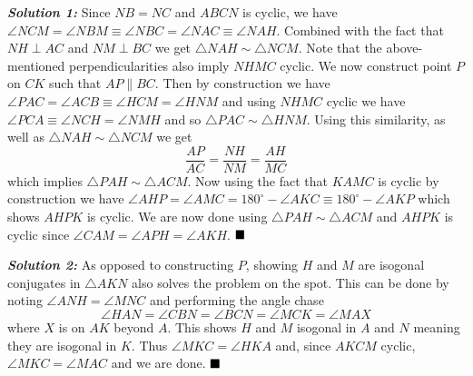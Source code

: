 \documentclass[11pt]{article}
\newcommand{\solnum}[1]{\textbf{\textit{Solution #1: }}}
\begin{document}
\begin{enumerate}
\begin{center}
\end{center}

\solnum{1} Since $NB=NC$ and $ABCN$ is cyclic, we have $\angle NCM=\angle NBM\equiv\angle NBC=\angle NAC\equiv\angle NAH$. Combined with the fact that $NH\perp AC$ and $NM\perp BC$ we get $\triangle NAH\sim\triangle NCM$. Note that the above-mentioned perpendicularities also imply $NHMC$ cyclic. We now construct point $P$ on $CK$ such that $AP\parallel BC$. Then by construction we have $\angle PAC =\angle ACB\equiv\angle HCM = \angle HNM$ and using $NHMC$ cyclic we have $\angle PCA\equiv\angle NCH = \angle NMH$ and so $\triangle PAC\sim\triangle HNM$. Using this similarity, as well as $\triangle NAH\sim\triangle NCM$ we get \[ \frac{AP}{AC}=\frac{NH}{NM}=\frac{AH}{MC} \] which implies $\triangle PAH\sim\triangle ACM$. Now using the fact that $KAMC$ is cyclic by construction we have $\angle AHP = \angle AMC = 180^{\circ}-\angle AKC\equiv 180^{\circ}-\angle AKP$ which shows $AHPK$ is cyclic. We are now done using $\triangle PAH\sim\triangle ACM$ and $AHPK$ is cyclic since \(\angle CAM = \angle APH = \angle AKH\). $\hfill\blacksquare$

\solnum{2} As opposed to constructing $P$, showing $H$ and $M$ are isogonal conjugates in $\triangle AKN$ also solves the problem on the spot. This can be done by noting $\angle ANH=\angle MNC$ and performing the angle chase \[\angle HAN = \angle CBN = \angle BCN = \angle MCK = \angle MAX\]where $X$ is on $AK$ beyond $A$. This shows $H$ and $M$ isogonal in $A$ and $N$ meaning they are isogonal in $K$. Thus $\angle MKC = \angle HKA$ and, since $AKCM$ cyclic, $\angle MKC = \angle MAC$ and we are done. $\hfill\blacksquare$


\end{enumerate}
\end{document}
